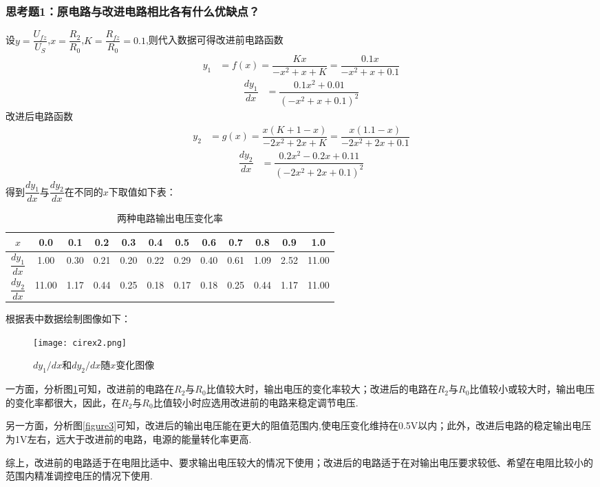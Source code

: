 \documentclass[12pt,a4paper,oneside,left=3.18,right=3.18,top=2.54,bottom=2.54]{ctexart}
\begin{document}
		\subsubsection{思考题1：原电路与改进电路相比各有什么优缺点？}
		设$y=\dfrac{U_{fz}}{U_S}$,$x=\dfrac{R_2}{R_0}$,$K=\dfrac{R_{fz}}{R_0}=0.1$,则代入数据可得改进前电路函数
		\begin{align}y_1 & =f(x)=\dfrac{Kx}{-x^2+x+K}=\dfrac{0.1x}{-x^2+x+0.1}\end{align}
		\begin{align}\dfrac{dy_1}{dx} & =\dfrac{0.1x^2+0.01}{(-x^2+x+0.1)^2}\end{align}
		改进后电路函数
		\begin{align}y_2 & =g(x)=\dfrac{x(K+1-x)}{-2x^2+2x+K}=\dfrac{x(1.1-x)}{-2x^2+2x+0.1}\end{align}
		\begin{align}\dfrac{dy_2}{dx} & =\dfrac{0.2x^2-0.2x+0.11}{(-2x^2+2x+0.1)^2}\end{align}
		得到$\dfrac{dy_1}{dx}$与$\dfrac{dy_2}{dx}$在不同的$x$下取值如下表：
		\begin{table}[H]
		\centering
			\begin{tabular}{|c|c|c|c|c|c|c|c|c|c|c|c|}
			\hline
			$x$&0.0&0.1&0.2&0.3&0.4&0.5&0.6&0.7&0.8&0.9&1.0\\
			\hline
			$\dfrac{dy_1}{dx}$&1.00&0.30&0.21&0.20&0.22&0.29&0.40&0.61&1.09&2.52&11.00\\
			\hline
			$\dfrac{dy_2}{dx}$&11.00&1.17&0.44&0.25&0.18&0.17&0.18&0.25&0.44&1.17&11.00\\
			\hline
			\end{tabular}
		\caption{两种电路输出电压变化率}
		\label{table2}
		\end{table}
		\noindent 根据表中数据绘制图像如下：
		\begin{figure}[H]
		\centering
		\texttt{[image: cirex2.png]}
		\caption{$dy_1/dx$和$dy_2/dx$随$x$变化图像}
		\label{figure4}
		\end{figure}
		一方面，分析图\ref{figure4}可知，改进前的电路在$R_2$与$R_0$比值较大时，输出电压的变化率较大；改进后的电路在$R_2$与$R_0$比值较小或较大时，输出电压的变化率都很大，因此，在$R_2$与$R_0$比值较小时应选用改进前的电路来稳定调节电压.\par
		另一方面，分析图\ref{figure3}可知，改进后的输出电压能在更大的阻值范围内,使电压变化维持在0.5V以内；此外，改进后电路的稳定输出电压为1V左右，远大于改进前的电路，电源的能量转化率更高.\par
		综上，改进前的电路适于在电阻比适中、要求输出电压较大的情况下使用；改进后的电路适于在对输出电压要求较低、希望在电阻比较小的范围内精准调控电压的情况下使用.\\
\end{document}
